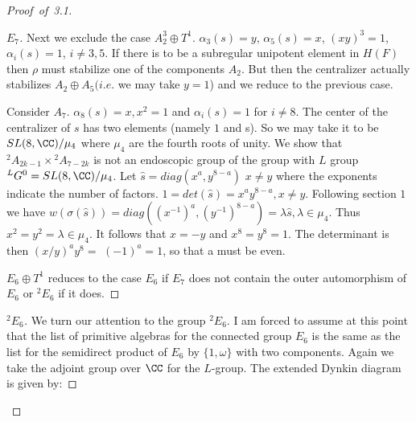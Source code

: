 \documentclass{memo-l}
\theoremstyle{definition}
\theoremstyle{remark}
\numberwithin{section}{chapter}
\numberwithin{equation}{chapter}
\begin{document}
\begin{proof}[Proof\ of\ 3.1]
\begin{proof}[$E_{7}$]
   Next we exclude the case $A_{2}^{3}\oplus T^{1}$.  ${\alpha}_{3}(s) = y$,
${\alpha}_{5}(s) = x$, $(xy)^{3} = 1$, ${\alpha}_{i}(s) = 1$, $i \ne 3,5$.  
If there is
to be a subregular unipotent element in $H(F)$ then ${\rho }$ must
stabilize one of the components $A_{2}$.  But then the centralizer actually
stabilizes $A_{2}\oplus A_{5} (i.e$.  we may take $y = 1$) and we reduce to the
previous case.

   Consider $A_{7}$.  ${\alpha}_{8}(s) = x, x^{2} = 1$ and ${\alpha}_{i}(s) = 1$
for $i \ne 8$.  The center of the centralizer of $s$ has two elements
(namely $1$ and s).  So we may take it to be $SL(8,{\CC})/{\mu}_{4}$
where ${\mu}_{4}$ are the fourth roots of unity.  We show that
${}^{2}A_{2k-1}\times {}^{2}A_{7-2k}$ is not an endoscopic group of the group with
$L$ group ${}^{L}G^{0}  =  SL(8,{\CC})/{\mu}_{4}$.  Let $\hat s  = 
diag(x^{a},y^{8-a})$ $x \ne y$ where the exponents indicate the number of
factors.  $1  =  det(\hat s )  =  x^{a}y^{8-a}, x \ne y$.  Following section $1$
we have $w({\sigma}(\hat s ))  =  diag((x^{-1})^{a},(y^{-1})^{8-a})  = 
{\lambda}\hat s , {\lambda}  \in  {\mu}_{4}$.  Thus $x^{2} = y^{2} = {\lambda}
 \in  {\mu}_{4}$.  It follows that $x = -y$ and $x^{8} = y^{8} = 1$.  The
determinant is then $(x/y)^{a}y^{8}  = $ $(-1)^{a}  =  1$, so that a must be
even.

   $E_{6}\oplus T^{1}$ reduces to the case $E_{6}$ if $E_{7}$ does not contain
the outer automorphism of $E_{6}$ or ${}^{2}E_{6}$ if it does.
\phantom\qedhere
\end{proof}


\begin{proof}[${}^{2}E_{6}$]  We turn our attention to the group ${}^{2}E_{6}$.  I am
forced to assume at this point that the list of primitive algebras for the
connected group $E_{6}$ is the same as the list for the semidirect
product of
$E_{6}$ by $\{1,{\omega}\}$ 
with two components.  Again we take the adjoint group over ${\CC}$ for the $L$-group.
The extended Dynkin diagram is given by:


\medskip


\end{proof}
\end{proof}
\end{document}
